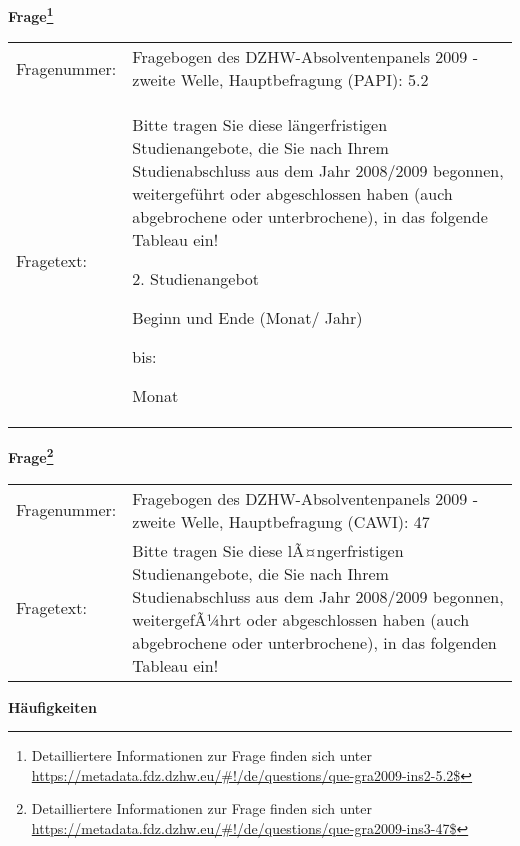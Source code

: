 				\vspace*{0.5cm}
                \noindent\textbf{Frage\footnote{Detailliertere Informationen zur Frage finden sich unter
		              \url{https://metadata.fdz.dzhw.eu/\#!/de/questions/que-gra2009-ins2-5.2$}}}\\
				\begin{tabularx}{\hsize}{@{}lX}
					Fragenummer: &
					  Fragebogen des DZHW-Absolventenpanels 2009 - zweite Welle, Hauptbefragung (PAPI):
					  5.2
 \\
					Fragetext: & Bitte tragen Sie diese längerfristigen Studienangebote, die Sie nach Ihrem Studienabschluss aus dem Jahr 2008/2009 begonnen, weitergeführt oder abgeschlossen haben (auch abgebrochene oder unterbrochene), in das folgende Tableau ein!\par  2. Studienangebot\par  Beginn und Ende (Monat/ Jahr)\par  bis:\par  Monat \\
				\end{tabularx}
				\vspace*{0.5cm}
                \noindent\textbf{Frage\footnote{Detailliertere Informationen zur Frage finden sich unter
		              \url{https://metadata.fdz.dzhw.eu/\#!/de/questions/que-gra2009-ins3-47$}}}\\
				\begin{tabularx}{\hsize}{@{}lX}
					Fragenummer: &
					  Fragebogen des DZHW-Absolventenpanels 2009 - zweite Welle, Hauptbefragung (CAWI):
					  47
 \\
					Fragetext: & Bitte tragen Sie diese lÃ¤ngerfristigen Studienangebote, die Sie nach Ihrem Studienabschluss aus dem Jahr 2008/2009 begonnen, weitergefÃ¼hrt oder abgeschlossen haben (auch abgebrochene oder unterbrochene), in das folgenden Tableau ein! \\
				\end{tabularx}





        		\vspace*{0.5cm}
                \noindent\textbf{Häufigkeiten}

